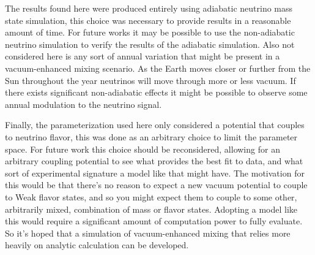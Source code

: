The results found here were produced entirely using adiabatic neutrino mass state simulation,
this choice was necessary to provide results in a reasonable amount of time.
For future works it may be possible to use the non-adiabatic neutrino simulation to
verify the results of the adiabatic simulation.
Also not considered here is any sort of annual variation that might be
present in a vacuum-enhanced mixing scenario.
As the Earth moves closer or further from the Sun throughout the year neutrinos
will move through more or less vacuum.
If there exists significant non-adiabatic effects it might be possible to observe
some annual modulation to the neutrino signal.

Finally, the parameterization used here only considered a potential that couples to neutrino flavor,
this was done as an arbitrary choice to limit the parameter space.
For future work this choice should be reconsidered, allowing for an arbitrary coupling
potential to see what provides the best fit to data, and what sort of experimental
signature a model like that might have.
The motivation for this would be that there's no reason to expect a new vacuum
potential to couple to Weak flavor states, and so you might expect them to couple
to some other, arbitrarily mixed, combination of mass or flavor states.
Adopting a model like this would require a significant amount of computation power
to fully evaluate.
So it's hoped that a simulation of vacuum-enhanced mixing that relies more heavily
on analytic calculation can be developed.




